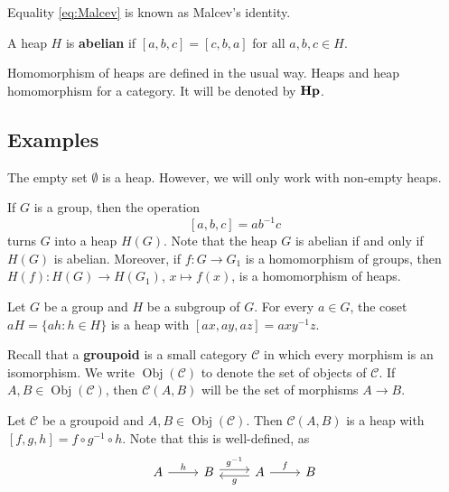 \documentclass{svmult}
\newcommand{\Obj}{\operatorname{Obj}}
\newcommand{\category}[1]{{\normalfont\textbf{#1}}}
\newcommand{\Hp}{\category{Hp}}
\begin{document}
Equality \eqref{eq:Malcev} is known as Malcev's identity. 

\begin{definition}
    A heap $H$ is \textbf{abelian} if $[a,b,c]=[c,b,a]$ for all $a,b,c\in H$. 
\end{definition}

Homomorphism of heaps are defined in the usual way. Heaps and heap homomorphism for a category. 
It will be denoted by $\Hp$. 

\subsection{Examples}

The empty set $\emptyset$ is a heap. However, we will only work with non-empty heaps. 

\begin{example}
\label{exa:H(G)}
    If $G$ is a group, then the operation
    \[
    [a,b,c]=ab^{-1}c
    \]
    turns $G$ into a heap $H(G)$. Note that
    the heap $G$ is abelian if and only if $H(G)$ is abelian. Moreover, 
    if $f\colon G\to G_1$ is a homomorphism of groups, then $H(f)\colon H(G)\to H(G_1)$, $x\mapsto f(x)$, is a 
    homomorphism of heaps. 
\end{example}

\begin{example}
    Let $G$ be a group and $H$ be a subgroup of $G$. For every $a\in G$, the coset
    $aH=\{ah:h\in H\}$ is a heap with
    $[ax,ay,az]=axy^{-1}z$. 
\end{example}

Recall that a \textbf{groupoid} is a small category $\mathcal{C}$ in which every morphism is an isomorphism. 
We write $\Obj(\mathcal{C})$ to denote the set of objects of $\mathcal{C}$. If $A,B\in\Obj(\mathcal{C})$, 
then $\mathcal{C}(A,B)$ will be the set of morphisms $A\to B$. 

\begin{example}
    Let $\mathcal{C}$ be a groupoid and $A,B\in\Obj(\mathcal{C})$. Then $\mathcal{C}(A,B)$ is a heap with
    $[f,g,h]=f\circ g^{-1}\circ h$. Note that this is well-defined, as
    \[
    \begin{tikzcd}
	A & B & A & B
	\arrow["h", from=1-1, to=1-2]
	\arrow["{g^{-1}}", shift left=1, from=1-2, to=1-3]
	\arrow["f", from=1-3, to=1-4]
	\arrow["g", shift left=1, from=1-3, to=1-2]
    \end{tikzcd}
    \]
\end{example}
\end{document}
